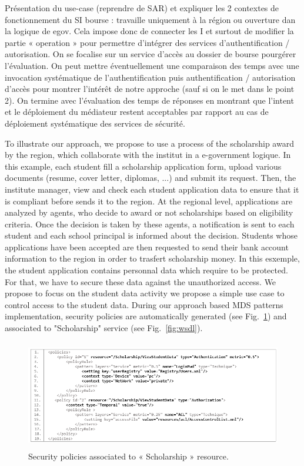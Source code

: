 \documentclass[runningheads,a4paper]{llncs}
\begin{document}
\label{sec:exemple}
Pr\'esentation du use-case (reprendre de SAR) et expliquer les 2 contextes de fonctionnement du SI bourse : travaille uniquement \`a la r\'egion ou ouverture dan la logique de egov. Cela impose donc de connecter les I et surtout de modifier la partie « operation » pour permettre d’int\'egrer des services d’authentification / autorisation. On se focalise sur un service d’acc\`es au dossier de bourse pourg\'erer l’\'evaluation.
On peut mettre \'eventuellement une comparaison des temps avec une invocation syst\'ematique de l’authentification puis authentification / autorisation d’acc\`es pour montrer l’int\'er\^et de notre approche (sauf si on le met dans le point 2). On termine avec l’\'evaluation des temps de r\'eponses en montrant que l’intent et le d\'eploiement du m\'ediateur restent acceptables par rapport au cas de d\'eploiement syst\'ematique des services de s\'ecurit\'e.


To illustrate our approach, we propose to use a process of the scholarship award by the region, which collaborate with the institut in a e-government logique. In this example, each student fill a scholarship application form, upload various documents (resume, cover letter, diplomas, ...) and submit its request. Then, the institute manager, view and check each student application data to ensure that it is compliant before sends it to the region. At the regional level, applications are analyzed by agents, who decide to award or not scholarships based on eligibility criteria. Once the decision is taken by these agents, a notification is sent to each student and each school principal is informed about the decision. Students whose applications have been accepted are then requested to send their bank account information to the region in order to trasfert scholarship money.
In this esxemple, the student application contains personnal data which require to be protected. For that, we have to secure these data against the unauthorized access.  
We propose to focus on the student data activity 
we propose a simple use case to control access to the student data. During our approach based MDS patterns implementation, security policies are automatically generated (see Fig.~\ref{fig:policy}) and associated to "Scholarship" service (see Fig.~\ref{fig:wsdl}).


\begin{figure}  
\centering
\includegraphics[height=135pt, width=380pt]{scholarshipPolicies.png}
\caption{Security policies associated to « Scholarship » resource.}
\label{fig:policy}
\end{figure}
\end{document}
